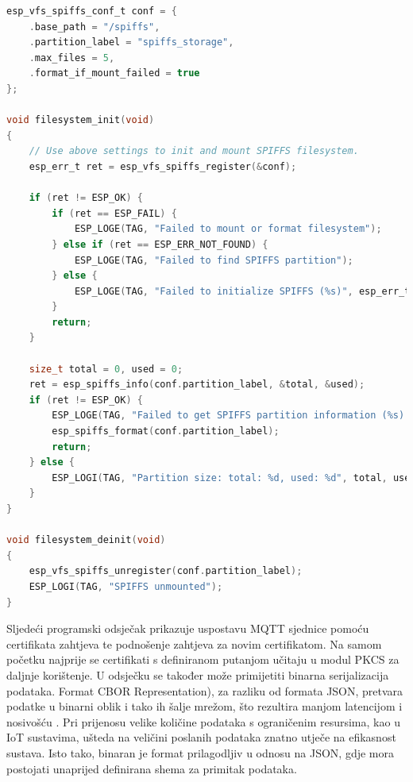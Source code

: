\begin{lstlisting}[caption={Inicijalizacije memorije tipa SPIFFS}, language=c]
esp_vfs_spiffs_conf_t conf = {
	.base_path = "/spiffs",
	.partition_label = "spiffs_storage",
	.max_files = 5,
	.format_if_mount_failed = true
};

void filesystem_init(void)
{
	// Use above settings to init and mount SPIFFS filesystem.
	esp_err_t ret = esp_vfs_spiffs_register(&conf);
	
	if (ret != ESP_OK) {
		if (ret == ESP_FAIL) {
			ESP_LOGE(TAG, "Failed to mount or format filesystem");
		} else if (ret == ESP_ERR_NOT_FOUND) {
			ESP_LOGE(TAG, "Failed to find SPIFFS partition");
		} else {
			ESP_LOGE(TAG, "Failed to initialize SPIFFS (%s)", esp_err_to_name(ret));
		}
		return;
	}
	
	size_t total = 0, used = 0;
	ret = esp_spiffs_info(conf.partition_label, &total, &used);
	if (ret != ESP_OK) {
		ESP_LOGE(TAG, "Failed to get SPIFFS partition information (%s). Formatting...", esp_err_to_name(ret));
		esp_spiffs_format(conf.partition_label);
		return;
	} else {
		ESP_LOGI(TAG, "Partition size: total: %d, used: %d", total, used);
	}
}

void filesystem_deinit(void)
{
	esp_vfs_spiffs_unregister(conf.partition_label);
	ESP_LOGI(TAG, "SPIFFS unmounted");
}
\end{lstlisting}

Sljedeći programski odsječak prikazuje uspostavu MQTT sjednice pomoću certifikata zahtjeva te podnošenje zahtjeva za novim certifikatom. Na samom početku najprije se certifikati s definiranom putanjom učitaju u modul PKCS za daljnje korištenje. U odsječku se također može primijetiti binarna serijalizacija podataka. Format CBOR  Representation), za razliku od formata JSON, pretvara podatke u binarni oblik i tako ih šalje mrežom, što rezultira manjom latencijom i nosivošću  \cite{cbor}. Pri prijenosu velike količine podataka s ograničenim resursima, kao u IoT sustavima, ušteda na veličini poslanih podataka znatno utječe na efikasnost sustava. Isto tako, binaran je format prilagodljiv u odnosu na JSON, gdje mora postojati unaprijed definirana shema za primitak podataka.

